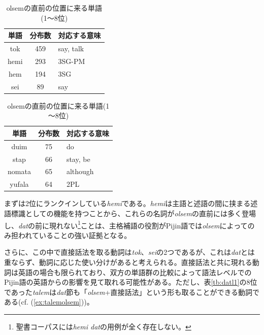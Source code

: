 \begin{table}[ht]
  \caption{olsemの直前の位置に来る単語(1～8位)}
  \label{tb:olseml1}
  \begin{minipage}{0.5\hsize}
  \begin{center}
    \begin{tabular}{|c||c|l|} \hline
      単語 & 分布数 & 対応する意味 \\ \hline \hline
      tok & 459 & say, talk\\ \hline
      hemi & 293 & 3SG-PM\\ \hline
      hem & 194 & 3SG\\ \hline
      sei & 89 & say\\ \hline
    \end{tabular}
  \end{center}
  \end{minipage}
  \begin{minipage}{0.5\hsize}
    \begin{center}
      \begin{tabular}{|c||c|l|} \hline
        単語 & 分布数 & 対応する意味 \\ \hline \hline
        duim & 75 & do \\ \hline
        stap & 66 & stay, be\\ \hline
        nomata & 65 & although\\ \hline
        yufala & 64 & 2PL\\ \hline
      \end{tabular}
    \end{center}
  \end{minipage}
\end{table}

まずは2位にランクインしている\textit{hemi}である。\textit{hemi}は主語と述語の間に挟まる述語標識としての機能を持つことから、これらの名詞が\textit{olsem}の直前には多く登場し、\textit{dat}の前に現れない\footnote{
聖書コーパスには\textit{hemi dat}の用例が全く存在しない。}ことは、主格補語の役割がPijin語では\textit{olsem}によってのみ担われていることの強い証拠となる。

さらに、この中で直接話法を取る動詞は\textit{tok}、\textit{sei}の2つであるが、これは\textit{dat}とは重ならず、動詞に応じた使い分けがあると考えられる。直接話法と共に現れる動詞は英語の場合も限られており\citep[1024]{english}、双方の単語群の比較によって語法レベルでのPijin語の英語からの影響を見て取れる可能性がある。ただし、表\ref{tb:datl1}の8位であった\textit{talem}は\textit{dat}節も「\textit{olsem}+直接話法」という形も取ることができる動詞である(cf. (\ref{ex:talemolsem}))。
